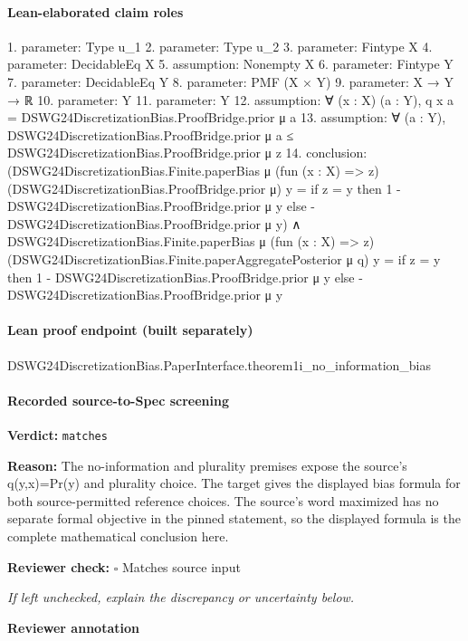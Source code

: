 \documentclass[10pt]{article}
\newcommand{\reviewerbox}{%
  \par\noindent\fbox{\parbox{0.96\linewidth}{\rule{0pt}{0.38in}}}\par
}
\newcommand{\reviewmatch}[1]{%
  \par\noindent\textbf{Reviewer check:} $\square$\; #1\par
  \noindent\emph{If left unchecked, explain the discrepancy or uncertainty below.}\par
}
\begin{document}
\paragraph{Lean-elaborated claim roles}\begin{ReviewVerbatim}
1. parameter: Type u_1
2. parameter: Type u_2
3. parameter: Fintype X
4. parameter: DecidableEq X
5. assumption: Nonempty X
6. parameter: Fintype Y
7. parameter: DecidableEq Y
8. parameter: PMF (X × Y)
9. parameter: X → Y → ℝ
10. parameter: Y
11. parameter: Y
12. assumption: ∀ (x : X) (a : Y), q x a = DSWG24DiscretizationBias.ProofBridge.prior μ a
13. assumption: ∀ (a : Y), DSWG24DiscretizationBias.ProofBridge.prior μ a ≤ DSWG24DiscretizationBias.ProofBridge.prior μ z
14. conclusion: (DSWG24DiscretizationBias.Finite.paperBias μ (fun (x : X) => z) (DSWG24DiscretizationBias.ProofBridge.prior μ) y =
    if z = y then 1 - DSWG24DiscretizationBias.ProofBridge.prior μ y
    else -DSWG24DiscretizationBias.ProofBridge.prior μ y) ∧
  DSWG24DiscretizationBias.Finite.paperBias μ (fun (x : X) => z)
      (DSWG24DiscretizationBias.Finite.paperAggregatePosterior μ q) y =
    if z = y then 1 - DSWG24DiscretizationBias.ProofBridge.prior μ y
    else -DSWG24DiscretizationBias.ProofBridge.prior μ y
\end{ReviewVerbatim}

\paragraph{Lean proof endpoint (built separately)}\begin{ReviewVerbatim}
DSWG24DiscretizationBias.PaperInterface.theorem1i_no_information_bias
\end{ReviewVerbatim}

\paragraph{Recorded source-to-Spec screening}
\textbf{Verdict:} \texttt{matches}
\\
{\raggedright
\textbf{Reason:} The no-\allowbreak{}information and plurality premises expose the source's q(y,x)=Pr(y) and plurality choice.\allowbreak{} The target gives the displayed bias formula for both source-\allowbreak{}permitted reference choices.\allowbreak{} The source's word maximized has no separate formal objective in the pinned statement, so the displayed formula is the complete mathematical conclusion here.\allowbreak{}
\par}
\reviewmatch{Matches source input}
\noindent\textbf{Reviewer annotation}\par
\reviewerbox
\clearpage
\hypertarget{source-claim-d8ad786b7cc58022}{}
\end{document}
